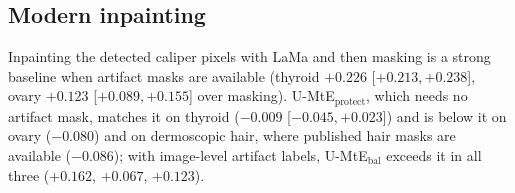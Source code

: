 \subsection{Modern inpainting}
Inpainting the detected caliper pixels with LaMa \citep{suvorov2022lama} and then masking is a strong baseline when
artifact masks are available (thyroid $+0.226$ [$+0.213, +0.238$], ovary $+0.123$ [$+0.089, +0.155$] over masking).
U-MtE$_{\text{protect}}$, which needs no artifact mask, matches it on thyroid ($-0.009$ [$-0.045, +0.023$]) and is
below it on ovary ($-0.080$) and on dermoscopic hair, where published hair masks are available ($-0.086$); with
image-level artifact labels, U-MtE$_{\text{bal}}$ exceeds it in all three ($+0.162$, $+0.067$, $+0.123$).
